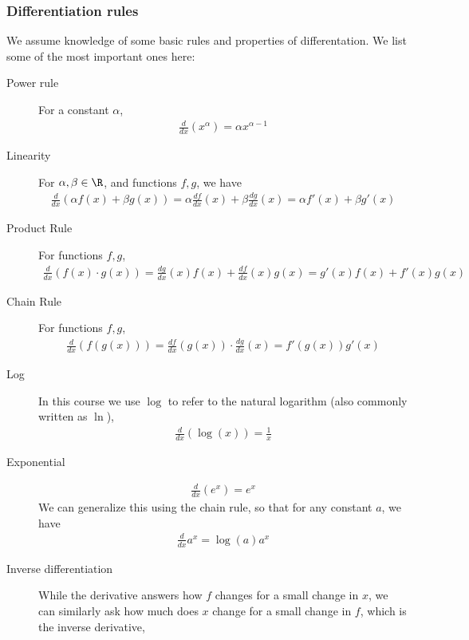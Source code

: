 \subsubsection*{Differentiation rules}
We assume knowledge of some basic rules and properties of differentation. We list some of the most important ones here:
\begin{description}
    \item[Power rule] For a constant $\alpha$, 
    \begin{align*}
        \frac{d}{dx}(x^\alpha) = \alpha x^{\alpha - 1}
    \end{align*}
    \item[Linearity] For $\alpha, \beta \in \R$, and functions $f, g$, we have
    \begin{align*}
        \frac{d}{dx} (\alpha f(x) + \beta g(x)) = \alpha \frac{df}{dx}(x) + \beta \frac{dg}{dx}(x) = \alpha f'(x) + \beta g'(x)
    \end{align*} 
    \item[Product Rule] For functions $f, g$,
    \begin{align*}
        \frac{d}{dx} (f(x) \cdot g(x)) = \frac{dg}{dx}(x)f(x) + \frac{df}{dx}(x) g(x) = g'(x) f(x) + f'(x) g(x)
    \end{align*}
    \item[Chain Rule] For functions $f, g$, 
    \begin{align*}
        \frac{d}{dx}(f(g(x))) = \frac{df}{dx}(g(x))  \cdot \frac{dg}{dx}(x) = f'(g(x)) g'(x)
    \end{align*}
    \item[Log] In this course we use $\log$ to refer to the natural logarithm (also commonly written as $\ln$),
    \begin{align*}
        \frac{d}{dx}(\log(x)) = \frac{1}{x}
    \end{align*}  
    \item[Exponential]
    \begin{align*}
        \frac{d}{dx}(e^x) = e^x
    \end{align*}
    We can generalize this using the chain rule, so that for any constant $a$, we have
    \begin{align*}
        \frac{d}{dx} a^{x} = \log(a) a^x
    \end{align*}
    \item[Inverse differentiation] While the derivative answers how $f$ changes for a small change in $x$, we can similarly ask how much does $x$ change for a small change in $f$, which is the inverse derivative,

\end{description}
